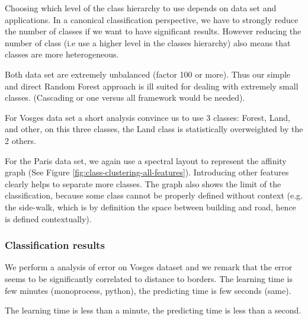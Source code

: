 		Choosing which level of the class hierarchy to use depends on data set and applications.
		In a canonical classification perspective, we have to strongly reduce the number of classes if we want to have significant results.
		However reducing the number of class (i.e use a higher level in the classes hierarchy) also means that classes are more heterogeneous.
		  
		Both data set are extremely unbalanced (factor 100 or more). Thus our simple and direct Random Forest approach is ill suited for dealing with extremely small classes. (Cascading or one versus all framework would be needed).
		
		For Vosges data set a short analysis convince us to use 3 classes: Forest, Land, and other, on this three classes, the Land class is statistically overweighted by the 2 others.
		
		For the Paris data set, we again use a spectral layout to represent the affinity graph (See Figure \ref{fig:class-clustering-all-features}).
		Introducing other features clearly helps to separate more classes.
		The graph also shows the limit of the classification, because some class cannot be properly defined without context (e.g. the side-walk, which is by definition the space between building and road, hence is defined contextually). 
		
		\subsubsection{Classification results}
		We perform a analysis of error on Vosges dataset and we remark that the error seems to be significantly correlated to distance to borders.
		The learning time is few minutes (monoprocess, python), the predicting time is few seconds (same).
				 
		The learning time is less than a minute, the predicting time is less than a second. 
		

